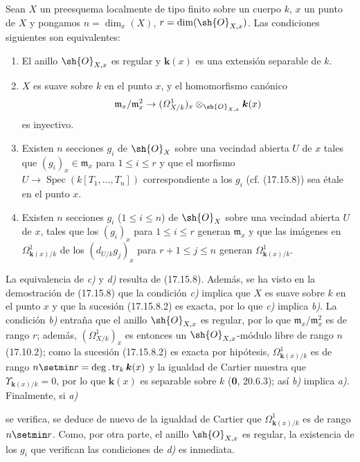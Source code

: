\begin{corollary}[17.15.9]
\label{IV.17.15.9}
Sean $X$ un preesquema localmente de tipo finito sobre un cuerpo $k$, $x$ un punto de $X$ y pongamos $n=\dim_x(X)$, $r=\dim(\sh{O}_{X,x})$. Las condiciones siguientes son equivalentes:
\begin{enumerate}
  \item[\textup{a)}] El anillo $\sh{O}_{X,x}$ es regular y $\boldsymbol{k}(x)$ es una extensión separable de $k$.
  \item[\textup{b)}] $X$ es suave sobre $k$ en el punto $x$, y el homomorfismo canónico
  \[
  \mathfrak m_x/\mathfrak m_x^2\to(\varOmega^1_{X/k})_x\otimes_{\sh{O}_{X,x}}\boldsymbol{k}(x)
  \]
  es inyectivo.
  \item[\textup{c)}] Existen $n$ secciones $g_i$ de $\sh{O}_X$ sobre una vecindad abierta $U$ de $x$ tales que $(g_i)_x\in\mathfrak m_x$ para $1\leq i\leq r$ y que el morfismo $U\to\operatorname{Spec}(k[T_1,\ldots,T_n])$ correspondiente a los $g_i$ \textup{(cf. (17.15.8))} sea étale en el punto $x$.
  \item[\textup{d)}] Existen $n$ secciones $g_i$ \textup{(}$1\leq i\leq n$\textup{)} de $\sh{O}_X$ sobre una vecindad abierta $U$ de $x$, tales que los $(g_i)_x$ para $1\leq i\leq r$ generan $\mathfrak m_x$ y que las imágenes en $\Omega^1_{\mathbf{k}(x)/k}$ de los $(d_{U/k}g_j)_x$ para $r+1\leq j\leq n$ generan $\Omega^1_{\mathbf{k}(x)/k}$.
\end{enumerate}
\end{corollary}

La equivalencia de \emph{c)} y \emph{d)} resulta de (17.15.8). Además, se ha visto en la demostración de (17.15.8) que la condición \emph{c)} implica que $X$ es suave sobre $k$ en el punto $x$ y que la sucesión (17.15.8.2) es exacta, por lo que \emph{c)} implica \emph{b)}. La condición \emph{b)} entraña que el anillo $\sh{O}_{X,x}$ es regular, por lo que $\mathfrak m_x/\mathfrak m_x^2$ es de rango $r$; además, $(\varOmega^1_{X/k})_x$ es entonces un $\sh{O}_{X,x}$-módulo libre de rango $n$ (17.10.2); como la sucesión (17.15.8.2) es exacta por hipótesis, $\Omega^1_{\mathbf{k}(x)/k}$ es de rango $n\setmin r=\deg.\operatorname{tr}_k \boldsymbol{k}(x)$ y la igualdad de Cartier muestra que $\Upsilon_{\mathbf{k}(x)/k}=0$, por lo que $\boldsymbol{k}(x)$ es separable sobre $k$ (\textbf 0, 20.6.3); así \emph{b)} implica \emph{a)}. Finalmente, si \emph{a)}


se verifica, se deduce de nuevo de la igualdad de Cartier que $\Omega^1_{\mathbf{k}(x)/k}$ es de rango $n\setmin r$. Como, por otra parte, el anillo $\sh{O}_{X,x}$ es regular, la existencia de los $g_i$ que verifican las condiciones de \emph{d)} es inmediata.


